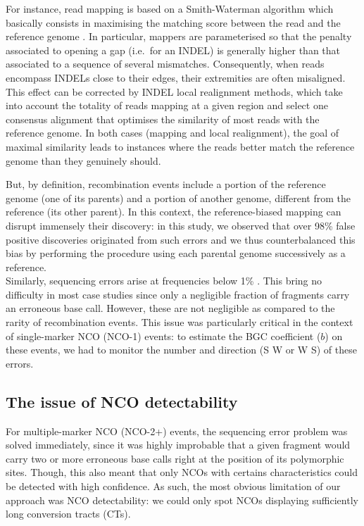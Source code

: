 For instance, read mapping is based on a Smith-Waterman algorithm which basically consists in maximising the matching score between the read and the reference genome \citep{smith1981identification}.
In particular, mappers are parameterised so that the penalty associated to opening a gap (i.e.\ for an INDEL) is generally higher than that associated to a sequence of several mismatches.
Consequently, when reads encompass INDELs close to their edges, their extremities are often misaligned.
This effect can be corrected by INDEL local realignment methods, which take into account the totality of reads mapping at a given region and select one consensus alignment that optimises the similarity of most reads with the reference genome.
In both cases (mapping and local realignment), the goal of maximal similarity leads to instances where the reads better match the reference genome than they genuinely should.

But, by definition, recombination events include a portion of the reference genome (one of its parents) and a portion of another genome, different from the reference (its other parent).
In this context, the reference-biased mapping can disrupt immensely their discovery: in this study, we observed that over 98\% false positive discoveries originated from such errors and we thus counterbalanced this bias by performing the procedure using each parental genome successively as a reference.\\

Similarly, sequencing errors arise at frequencies below 1\% \citep{fox2014accuracy,pfeiffer2018systematic}.
This bring no difficulty in most case studies since only a negligible fraction of fragments carry an erroneous base call.
However, these are not negligible as compared to the rarity of recombination events.
This issue was particularly critical in the context of single-marker NCO (NCO-1) events:
to estimate the BGC coefficient ($b$) on these events, we had to monitor the number and direction (S\textrightarrow{} W or W\textrightarrow{} S) of these errors.




\subsection{The issue of NCO detectability}

For multiple-marker NCO (NCO-2+) events, the sequencing error problem was solved immediately, since it was highly improbable that a given fragment would carry two or more erroneous base calls right at the position of its polymorphic sites.
Though, this also meant that only NCOs with certains characteristics could be detected with high confidence.
As such, the most obvious limitation of our approach was NCO detectability: we could only spot NCOs displaying sufficiently long conversion tracts (CTs).

